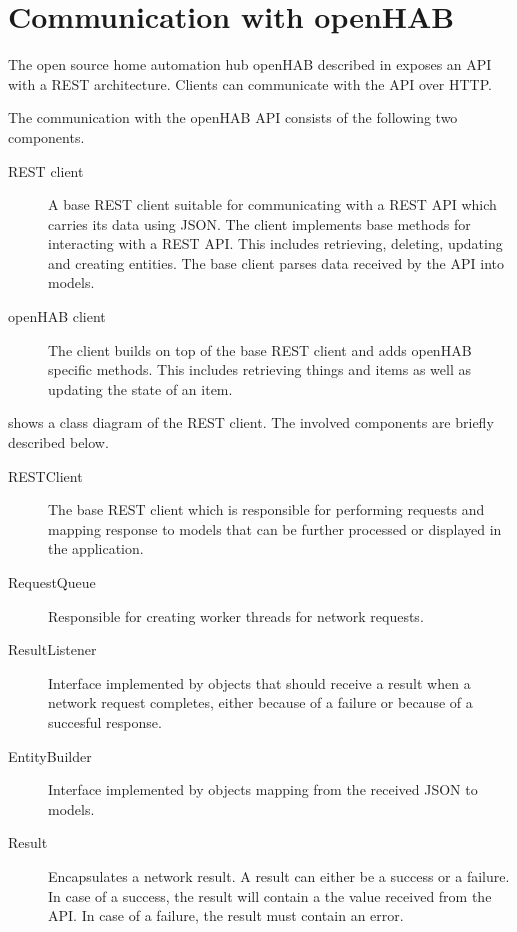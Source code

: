 \section{Communication with openHAB}
\label{sec:design:communication-with-openhab}

The open source home automation hub openHAB described in  exposes an API with a REST architecture. Clients can communicate with the API over HTTP.

The communication with the openHAB API consists of the following two components.

\begin{description}
\item[REST client] A base REST client suitable for communicating with a REST API which carries its data using JSON. The client implements base methods for interacting with a REST API. This includes retrieving, deleting, updating and creating entities. The base client parses data received by the API into models.
\item[openHAB client] The client builds on top of the base REST client and adds openHAB specific methods. This includes retrieving things and items as well as updating the state of an item.
\end{description}

 shows a class diagram of the REST client. The involved components are briefly described below.

\begin{description}
\item[RESTClient] The base REST client which is responsible for performing requests and mapping response to models that can be further processed or displayed in the application.
\item[RequestQueue] Responsible for creating worker threads for network requests.
\item[ResultListener] Interface implemented by objects that should receive a result when a network request completes, either because of a failure or because of a succesful response.
\item[EntityBuilder] Interface implemented by objects mapping from the received JSON to models.
\item[Result] Encapsulates a network result. A result can either be a success or a failure. In case of a success, the result will contain a the value received from the API. In case of a failure, the result must contain an error.
\end{description}

